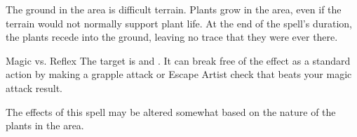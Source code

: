 \begin{spellheader}
\end{spellheader}
\begin{spellcontent}
    \begin{spelltargetinginfo}
    \end{spelltargetinginfo}
    \begin{spelleffects}
        \spelleffect The ground in the area is difficult terrain. Plants grow in the area, even if the terrain would not normally support plant life. At the end of the spell's duration, the plants recede into the ground, leaving no trace that they were ever there.
        \spelldur{\durshort \dismissable}
    \end{spelleffects}
\end{spellcontent}
\begin{spellsubcontent}
    \begin{spelltargetinginfo}
    \end{spelltargetinginfo}
    \begin{spelleffects}
        \begin{spellattack}{Magic vs. Reflex}
            \spellsuccess The target is \entangled and \immobilized. It can break free of the effect as a standard action by making a grapple attack or Escape Artist check that beats your magic attack result.
        \end{spellattack}
    \end{spelleffects}
\end{spellsubcontent}
\begin{spellfooter}
    \spellnotes The effects of this spell may be altered somewhat based on the nature of the plants in the area.
\end{spellfooter}

